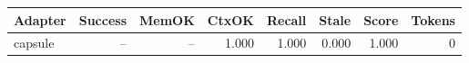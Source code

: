 \begin{tabular}{lrrrrrrr}
\hline
Adapter & Success & MemOK & CtxOK & Recall & Stale & Score & Tokens \\
\hline
capsule & -- & -- & 1.000 & 1.000 & 0.000 & 1.000 & 0 \\
\hline
\end{tabular}
